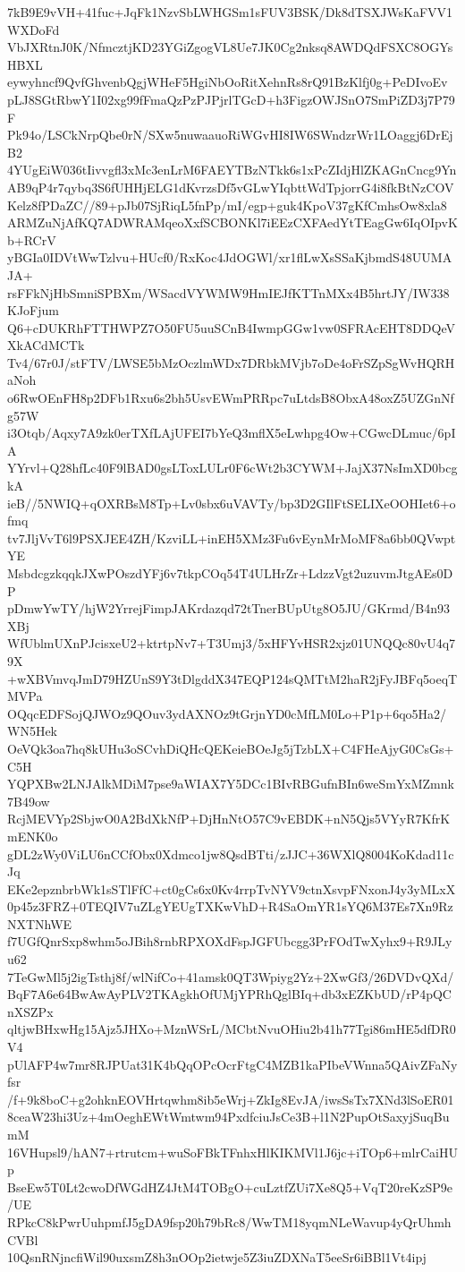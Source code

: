 7kB9E9vVH+41fuc+JqFk1NzvSbLWHGSm1sFUV3BSK/Dk8dTSXJWsKaFVV1WXDoFd
VbJXRtnJ0K/NfmcztjKD23YGiZgogVL8Ue7JK0Cg2nksq8AWDQdFSXC8OGYsHBXL
eywyhncf9QvfGhvenbQgjWHeF5HgiNbOoRitXehnRs8rQ91BzKlfj0g+PeDIvoEv
pLJ8SGtRbwY1I02xg99fFmaQzPzPJPjrlTGcD+h3FigzOWJSnO7SmPiZD3j7P79F
Pk94o/LSCkNrpQbe0rN/SXw5nuwaauoRiWGvHI8IW6SWndzrWr1LOaggj6DrEjB2
4YUgEiW036tIivvgfl3xMc3enLrM6FAEYTBzNTkk6s1xPcZIdjHlZKAGnCncg9Yn
AB9qP4r7qybq3S6fUHHjELG1dKvrzsDf5vGLwYIqbttWdTpjorrG4i8fkBtNzCOV
Kelz8fPDaZC//89+pJb07SjRiqL5fnPp/mI/egp+guk4KpoV37gKfCmhsOw8xla8
ARMZuNjAfKQ7ADWRAMqeoXxfSCBONKl7iEEzCXFAedYtTEagGw6IqOIpvKb+RCrV
yBGIa0IDVtWwTzlvu+HUcf0/RxKoc4JdOGWl/xr1flLwXsSSaKjbmdS48UUMAJA+
rsFFkNjHbSmniSPBXm/WSacdVYWMW9HmIEJfKTTnMXx4B5hrtJY/IW338KJoFjum
Q6+cDUKRhFTTHWPZ7O50FU5uuSCnB4IwmpGGw1vw0SFRAcEHT8DDQeVXkACdMCTk
Tv4/67r0J/stFTV/LWSE5bMzOczlmWDx7DRbkMVjb7oDe4oFrSZpSgWvHQRHaNoh
o6RwOEnFH8p2DFb1Rxu6s2bh5UsvEWmPRRpc7uLtdsB8ObxA48oxZ5UZGnNfg57W
i3Otqb/Aqxy7A9zk0erTXfLAjUFEI7bYeQ3mflX5eLwhpg4Ow+CGwcDLmuc/6pIA
YYrvl+Q28hfLc40F9lBAD0gsLToxLULr0F6cWt2b3CYWM+JajX37NsImXD0bcgkA
ieB//5NWIQ+qOXRBsM8Tp+Lv0sbx6uVAVTy/bp3D2GIlFtSELIXeOOHIet6+ofmq
tv7JljVvT6l9PSXJEE4ZH/KzviLL+inEH5XMz3Fu6vEynMrMoMF8a6bb0QVwptYE
MsbdcgzkqqkJXwPOszdYFj6v7tkpCOq54T4ULHrZr+LdzzVgt2uzuvmJtgAEs0DP
pDmwYwTY/hjW2YrrejFimpJAKrdazqd72tTnerBUpUtg8O5JU/GKrmd/B4n93XBj
WfUblmUXnPJcisxeU2+ktrtpNv7+T3Umj3/5xHFYvHSR2xjz01UNQQc80vU4q79X
+wXBVmvqJmD79HZUnS9Y3tDlgddX347EQP124sQMTtM2haR2jFyJBFq5oeqTMVPa
OQqcEDFSojQJWOz9QOuv3ydAXNOz9tGrjnYD0cMfLM0Lo+P1p+6qo5Ha2/WN5Hek
OeVQk3oa7hq8kUHu3oSCvhDiQHcQEKeieBOeJg5jTzbLX+C4FHeAjyG0CsGs+C5H
YQPXBw2LNJAlkMDiM7pse9aWIAX7Y5DCc1BIvRBGufnBIn6weSmYxMZmnk7B49ow
RcjMEVYp2SbjwO0A2BdXkNfP+DjHnNtO57C9vEBDK+nN5Qjs5VYyR7KfrKmENK0o
gDL2zWy0ViLU6nCCfObx0Xdmco1jw8QsdBTti/zJJC+36WXlQ8004KoKdad11cJq
EKe2epznbrbWk1sSTlFfC+ct0gCs6x0Kv4rrpTvNYV9ctnXsvpFNxonJ4y3yMLxX
0p45z3FRZ+0TEQIV7uZLgYEUgTXKwVhD+R4SaOmYR1sYQ6M37Es7Xn9RzNXTNhWE
f7UGfQnrSxp8whm5oJBih8rnbRPXOXdFspJGFUbcgg3PrFOdTwXyhx9+R9JLyu62
7TeGwMl5j2igTsthj8f/wlNifCo+41amsk0QT3Wpiyg2Yz+2XwGf3/26DVDvQXd/
BqF7A6e64BwAwAyPLV2TKAgkhOfUMjYPRhQglBIq+db3xEZKbUD/rP4pQCnXSZPx
qltjwBHxwHg15Ajz5JHXo+MznWSrL/MCbtNvuOHiu2b41h77Tgi86mHE5dfDR0V4
pUlAFP4w7mr8RJPUat31K4bQqOPcOcrFtgC4MZB1kaPIbeVWnna5QAivZFaNyfsr
/f+9k8boC+g2ohknEOVHrtqwhm8ib5eWrj+ZkIg8EvJA/iwsSsTx7XNd3lSoER01
8ceaW23hi3Uz+4mOeghEWtWmtwm94PxdfciuJsCe3B+l1N2PupOtSaxyjSuqBumM
16VHupsl9/hAN7+rtrutcm+wuSoFBkTFnhxHlKIKMVl1J6jc+iTOp6+mlrCaiHUp
BseEw5T0Lt2cwoDfWGdHZ4JtM4TOBgO+cuLztfZUi7Xe8Q5+VqT20reKzSP9e/UE
RPkcC8kPwrUuhpmfJ5gDA9fsp20h79bRc8/WwTM18yqmNLeWavup4yQrUhmhCVBl
10QsnRNjncfiWil90uxsmZ8h3nOOp2ietwje5Z3iuZDXNaT5eeSr6iBBl1Vt4ipj

